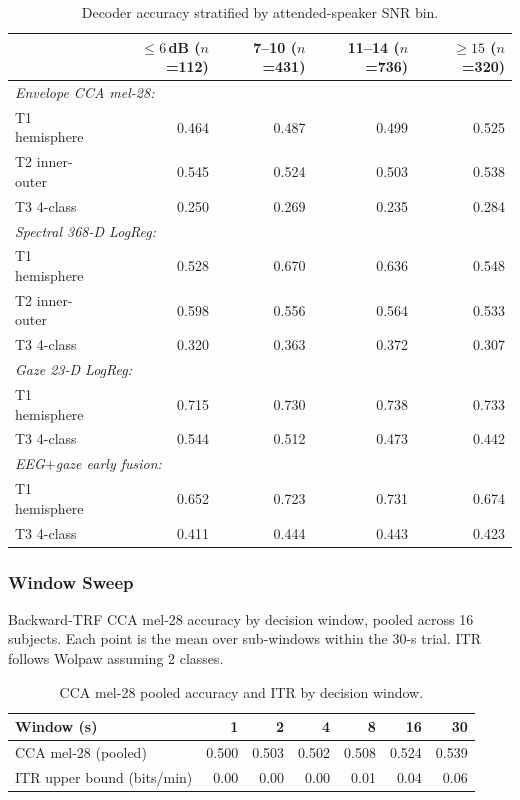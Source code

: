 \documentclass{article}
\begin{document}
\begin{table}[ht]
\centering
\small
\caption{Decoder accuracy stratified by attended-speaker SNR bin.}
\label{tab:snr}
\begin{tabular}{lrrrr}
\toprule
 & $\le 6$\,dB ($n$=112) & 7--10 ($n$=431) & 11--14 ($n$=736) &
    $\ge 15$ ($n$=320) \\
\midrule
\multicolumn{5}{l}{\emph{Envelope CCA mel-28:}} \\
\quad T1 hemisphere  & 0.464 & 0.487 & 0.499 & 0.525 \\
\quad T2 inner-outer & 0.545 & 0.524 & 0.503 & 0.538 \\
\quad T3 4-class     & 0.250 & 0.269 & 0.235 & 0.284 \\
\multicolumn{5}{l}{\emph{Spectral 368-D LogReg:}} \\
\quad T1 hemisphere  & 0.528 & 0.670 & 0.636 & 0.548 \\
\quad T2 inner-outer & 0.598 & 0.556 & 0.564 & 0.533 \\
\quad T3 4-class     & 0.320 & 0.363 & 0.372 & 0.307 \\
\multicolumn{5}{l}{\emph{Gaze 23-D LogReg:}} \\
\quad T1 hemisphere  & 0.715 & 0.730 & 0.738 & 0.733 \\
\quad T3 4-class     & 0.544 & 0.512 & 0.473 & 0.442 \\
\multicolumn{5}{l}{\emph{EEG$+$gaze early fusion:}} \\
\quad T1 hemisphere  & 0.652 & 0.723 & 0.731 & 0.674 \\
\quad T3 4-class     & 0.411 & 0.444 & 0.443 & 0.423 \\
\bottomrule
\end{tabular}
\end{table}

\subsubsection{Window Sweep}
\label{app:window}

Backward-TRF CCA mel-28 accuracy by decision window, pooled across 16
subjects. Each point is the mean over sub-windows within the 30-s trial.
ITR follows Wolpaw assuming 2 classes.

\begin{table}[ht]
\centering
\small
\caption{CCA mel-28 pooled accuracy and ITR by decision window.}
\label{tab:window}
\begin{tabular}{lrrrrrr}
\toprule
Window (s) & 1 & 2 & 4 & 8 & 16 & 30 \\
\midrule
CCA mel-28 (pooled)         & 0.500 & 0.503 & 0.502 & 0.508 & 0.524 & 0.539 \\
ITR upper bound (bits/min)  & 0.00  & 0.00  & 0.00  & 0.01  & 0.04  & 0.06  \\
\bottomrule
\end{tabular}
\end{table}
\end{document}
